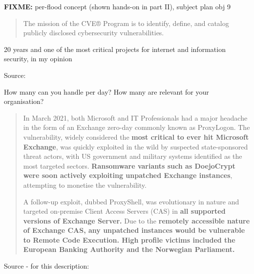 \documentclass[Screen16to9,17pt]{foils}
\begin{document}
\begin{list2}
\item \textbf{FIXME:} per-flood concept (shown hands-on in part II), subject plan obj 9
\end{list2}



\begin{quote}
The mission of the CVE® Program is to identify, define, and catalog publicly disclosed cybersecurity vulnerabilities.
\end{quote}

20 years and one of the most critical projects for internet and information security, in my opinion


Source: 

\begin{list2}
\item How many can you handle per day? How many are relevant for your organisation?
\end{list2}

\begin{quote}
In March 2021, both Microsoft and IT Professionals had a major headache in the form of an Exchange zero-day commonly known as ProxyLogon. The vulnerability, widely considered the {\bf most critical to ever hit Microsoft Exchange}, was quickly exploited in the wild by suspected state-sponsored threat actors, with US government and military systems identified as the most targeted sectors. {\bf Ransomware variants such as DoejoCrypt were soon actively exploiting unpatched Exchange instances}, attempting to monetise the vulnerability.

A follow-up exploit, dubbed ProxyShell, was evolutionary in nature and targeted on-premise Client Access Servers (CAS) in {\bf all supported versions of Exchange Server.} Due to the {\bf remotely accessible nature of Exchange CAS, any unpatched instances would be vulnerable to Remote Code Execution. High profile victims included the European Banking Authority and the Norwegian Parliament.}
\end{quote}
Source - for this description:\\
\end{document}
